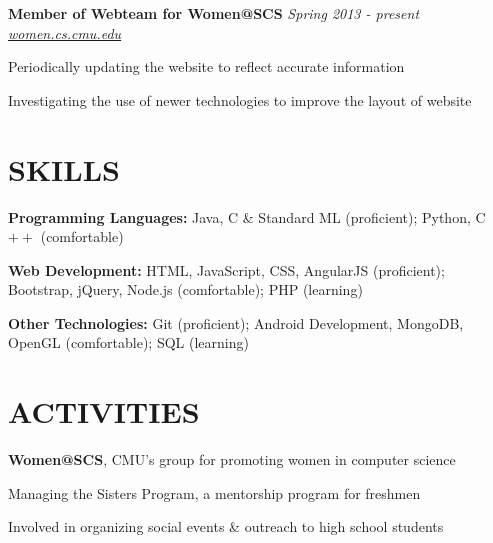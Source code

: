 \documentclass[margin, 11pt]{res} %
\begin{document}
\begin{resume}
\vspace{3pt}

{\bf Member of Webteam for Women@SCS} \hfill {\sl Spring 2013 - present}\\
\href{{women.cs.cmu.edu}}{\sl women.cs.cmu.edu}

\begin{itemize} \itemsep -2pt
{\small \item Periodically updating the website to reflect accurate information
\item Investigating the use of newer technologies to improve the layout of website}
\end{itemize}


\section{SKILLS}

{\bf Programming Languages:}
Java, C \& Standard ML (proficient); Python, C$++$ (comfortable)

\vspace{5pt}

{\bf Web Development:}
HTML, JavaScript, CSS, AngularJS (proficient);\\ Bootstrap, jQuery, Node.js (comfortable); PHP (learning)

\vspace{5pt}

{\bf Other Technologies:}
Git (proficient); Android Development, MongoDB, OpenGL (comfortable); SQL (learning)


\section{ACTIVITIES}

{\bf Women@SCS}, CMU's group for promoting women in computer science

\begin{itemize} \itemsep -2pt
{\small \item Managing the Sisters Program, a mentorship program for freshmen
\item Involved in organizing social events \& outreach to high school students}
\end{itemize}


\end{resume}
\end{document}
